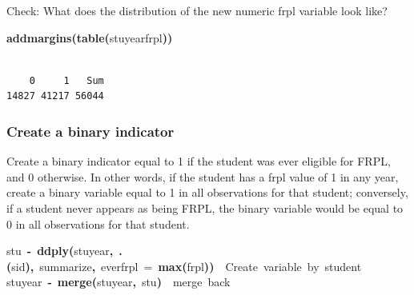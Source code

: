 \documentclass[12pt]{article}
\makeatletter
\newcommand{\hlfunctioncall}[1]{\textcolor[rgb]{0.501960784313725,0,0.329411764705882}{\textbf{#1}}}%
\newcommand{\hlkeyword}[1]{\textcolor[rgb]{0,0,0}{\textbf{#1}}}%
\newcommand{\hlargument}[1]{\textcolor[rgb]{0.690196078431373,0.250980392156863,0.0196078431372549}{#1}}%
\newcommand{\hlcomment}[1]{\textcolor[rgb]{0.180392156862745,0.6,0.341176470588235}{#1}}%
\newcommand{\hlassignement}[1]{\textcolor[rgb]{0,0,0}{\textbf{#1}}}%
\newcommand{\hlsymbol}[1]{\textcolor[rgb]{0,0,0}{#1}}%
\newcommand{\hlstd}[1]{\textcolor[rgb]{0,0,0}{#1}}%
\newenvironment{kframe}{%
 \def\FrameCommand##1{\hskip\@totalleftmargin \hskip-\fboxsep
 \colorbox{shadecolor}{##1}\hskip-\fboxsep
     \hskip-\linewidth \hskip-\@totalleftmargin \hskip\columnwidth}%
 \MakeFramed {\advance\hsize-\width
   \@totalleftmargin\z@ \linewidth\hsize
   \@setminipage}}%
 {\par\unskip\endMakeFramed}
\newenvironment{knitrout}{}{} %
\renewenvironment{knitrout}{\begin{footnotesize}}{\end{footnotesize}}
\makeatother
\begin{document}
Check:  What does the distribution of the new numeric frpl variable look like?

\begin{knitrout}
\color{fgcolor}\begin{kframe}
\begin{flushleft}
\ttfamily\noindent
\hlfunctioncall{addmargins}\hlkeyword{(}\hlfunctioncall{table}\hlkeyword{(}\hlsymbol{stuyear}\hlkeyword{\usebox{\hlnormalsizeboxdollar}}\hlsymbol{frpl}\hlkeyword{)}\hlkeyword{)}\mbox{}
\normalfont
\end{flushleft}
\begin{verbatim}

    0     1   Sum 
14827 41217 56044 
\end{verbatim}
\end{kframe}
\end{knitrout}


\subsubsection{Create a binary indicator}
Create a binary indicator equal to 1 if the student was ever eligible for FRPL, and 0 otherwise. In other words, if the student 
has a frpl value of 1 in any year, create a binary variable equal to 1 in all observations for that student; conversely, if a student 
never appears as being FRPL, the binary variable would be equal to 0 in all observations for that student.

\begin{knitrout}
\color{fgcolor}\begin{kframe}
\begin{flushleft}
\ttfamily\noindent
\hlsymbol{stu}{\ }\hlassignement{\usebox{\hlnormalsizeboxlessthan}-}{\ }\hlfunctioncall{ddply}\hlkeyword{(}\hlsymbol{stuyear}\hlkeyword{,}{\ }\hlfunctioncall{.}\hlkeyword{(}\hlsymbol{sid}\hlkeyword{)}\hlkeyword{,}{\ }\hlsymbol{summarize}\hlkeyword{,}{\ }\hlargument{ever\usebox{\hlnormalsizeboxunderscore}frpl}{\ }\hlargument{=}{\ }\hlfunctioncall{max}\hlkeyword{(}\hlsymbol{frpl}\hlkeyword{)}\hlkeyword{)}{\ }{\ }\hlcomment{\usebox{\hlnormalsizeboxhash}{\ }Create{\ }variable{\ }by{\ }student}\hspace*{\fill}\\
\hlstd{}\hlsymbol{stuyear}{\ }\hlassignement{\usebox{\hlnormalsizeboxlessthan}-}{\ }\hlfunctioncall{merge}\hlkeyword{(}\hlsymbol{stuyear}\hlkeyword{,}{\ }\hlsymbol{stu}\hlkeyword{)}{\ }{\ }\hlcomment{\usebox{\hlnormalsizeboxhash}{\ }merge{\ }back}\mbox{}
\normalfont
\end{flushleft}
\end{kframe}
\end{knitrout}
\end{document}
